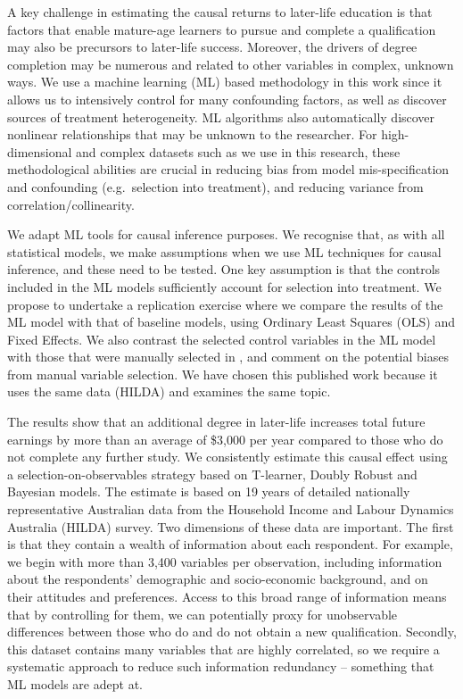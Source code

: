 \documentclass[12pt, a4paper]{article}
\begin{document}
A key challenge in estimating the causal returns to later-life education is
that factors that enable mature-age learners to pursue and complete a
qualification may also be precursors to later-life success. Moreover, the
drivers of degree completion may be numerous and related to other variables in
complex, unknown ways. We use a machine learning (ML) based methodology in this
work since it allows us to intensively control for many confounding factors, as
well as discover sources of treatment heterogeneity. ML algorithms also
automatically discover nonlinear relationships that may be unknown to the
researcher. For high-dimensional and complex datasets such as we use in this
research, these methodological abilities are crucial in
reducing bias from model mis-specification and confounding (e.g.~selection into
treatment), and reducing variance from correlation/collinearity.  

We adapt ML tools for causal inference purposes. We recognise that, as with all statistical models, we make assumptions when we use ML techniques for causal inference, and these need to be tested. One key assumption is that the controls included in the ML models sufficiently account for selection into treatment. We propose to undertake a replication exercise where we compare the results of the ML model with that of baseline models, using Ordinary Least Squares (OLS) and Fixed Effects. We also contrast the selected control variables in the ML model with those that were manually selected in \cite{chesters2015}, and comment on the potential biases from manual variable selection. We have chosen this published work because it uses the same data (HILDA) and examines the same topic.

The results show that an additional degree in later-life increases total future
earnings by more than an average of \$3,000 per year compared to those who do
not complete any further study. We consistently estimate this causal effect
using a selection-on-observables strategy based on T-learner, Doubly Robust and
Bayesian models. The estimate is based on 19 years of detailed nationally
representative Australian data from the Household Income and Labour Dynamics
Australia (HILDA) survey. Two dimensions of these data are important. The first
is that they contain a wealth of information about each respondent. For
example, we begin with more than 3,400 variables per observation, including
information about the respondents' demographic and socio-economic background,
and on their attitudes and preferences. Access to this broad range of
information means that by controlling for them, we can potentially proxy for
unobservable differences between those who do and do not obtain a new
qualification. Secondly, this dataset contains many variables that are highly
correlated, so we require a systematic approach to reduce such information
redundancy -- something that ML models are adept at.
\end{document}
